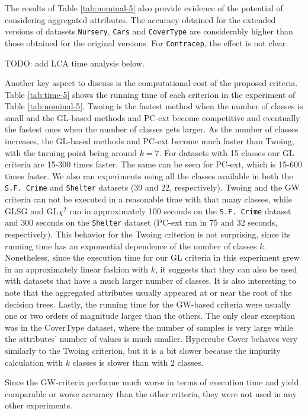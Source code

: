 The results of  Table \ref{tab:nominal-5} also provide evidence of  the potential of considering aggregated attributes. The accuracy obtained for the extended versions of datasets
{\tt Nursery}, {\tt Cars} and {\tt CoverType} are considerably higher than those obtained for the original versions. For {\tt Contracep}, the effect is not clear.

TODO: add LCA time analysis below.

Another key aspect to discuss is the computational cost of the proposed criteria. Table \ref{tab:time-5} shows the running time of each criterion in the experiment of Table \ref{tab:nominal-5}. Twoing is the fastest method when the number of classes is small and the GL-based methods  and PC-ext become competitive and eventually the fastest ones when the number of classes gets larger. As the number of classes increases, the GL-based methods and PC-ext become much faster than Twoing, with the turning point being around $k=7$. For datasets with 15 classes our GL criteria are 15-300 times faster. The same can be seen for PC-ext, which is 15-600 times faster. We also ran experiments using all the classes available in both the {\tt S.F. Crime} and {\tt Shelter} datasets (39 and 22, respectively). Twoing and the GW criteria can not be executed in a reasonable time with that many classes, while GLSG and GL$\chi^2$ ran in approximately 100 seconds on the {\tt S.F. Crime} dataset and  300 seconds on the {\tt Shelter} dataset (PC-ext ran in 75 and 32 seconds, respectively). This behavior for the Twoing criterion is not surprising, since its running time has an exponential dependence of the number of classes $k$. Nonetheless, since the execution time for our GL criteria in this experiment grew in an approximately linear fashion with $k$, it suggests that they can also be used with datasets that have a much larger number of classes. It is also interesting to note that the aggregated attributes usually appeared at or near the root of the decision trees. Lastly, the running time for the GW-based criteria were usually one or two orders of magnitude larger than the others. The only clear exception was in the CoverType dataset, where the number of samples is very large while the attributes’ number of values is much smaller. Hypercube Cover behaves very similarly to the Twoing criterion, but it is a bit slower because the impurity calculation with $k$ classes is slower than with $2$ classes.

Since the GW-criteria performe much worse in terms of execution time and yield comparable or worse accuracy than the other criteria, they were not used in any other experiments.

